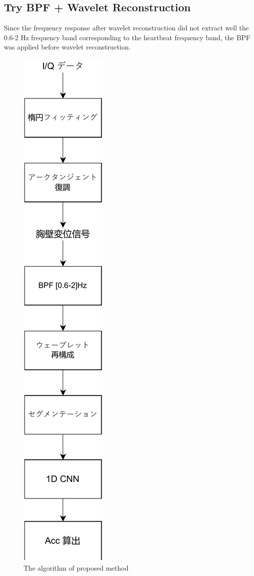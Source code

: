 \documentclass[dvipdfmx]{article}
\begin{document}
\subsection{Try BPF + Wavelet Reconstruction}
Since the frequency response after wavelet reconstruction did not extract well the 0.6-2 Hz frequency band corresponding to the heartbeat frequency band, the BPF was applied before wavelet reconstruction.

\begin{figure}[H]
\begin{center}
\includegraphics[width=0.2\linewidth]{./img/proposed_method.drawio_addBPF.pdf}
\end{center}
\caption{The algorithm of proposed method}
\end{figure}
\end{document}
